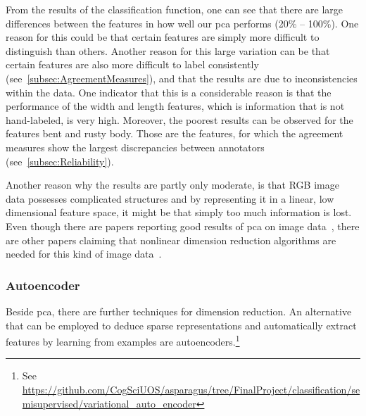 \bigskip
From the results of the classification function, one can see that there are large differences between the features in how well our \acrshort{pca} performs (20\% -- 100\%).
One reason for this could be that certain features are simply more difficult to distinguish than others. Another reason for this large variation can be that certain features are also more difficult to label consistently (see~\autoref{subsec:AgreementMeasures}), and that the results are due to inconsistencies within the data. One indicator that this is a considerable reason is that the performance of the width and length features, which is information that is not hand-labeled, is very high. Moreover, the poorest results can be observed for the features bent and rusty body. Those are the features, for which the agreement measures show the largest discrepancies between annotators (see~\autoref{subsec:Reliability}).  

\bigskip
Another reason why the results are partly only moderate, is that RGB image data possesses complicated structures and by representing it in a linear, low dimensional feature space, it might be that simply too much information is lost. Even though there are papers reporting good results of \acrshort{pca} on image data~\citep{turk1991face,lata2009}, there are other papers claiming that nonlinear dimension reduction algorithms are needed for this kind of image data~\citep{olaode2014}.


\subsubsection{Autoencoder}
\label{subsec:Autoencoder}

Beside \acrshort{pca}, there are further techniques for dimension reduction. An alternative that can be employed to deduce sparse representations and automatically extract features by learning from examples are autoencoders.\footnote{See \url{https://github.com/CogSciUOS/asparagus/tree/FinalProject/classification/semisupervised/variational\_auto\_encoder}}


